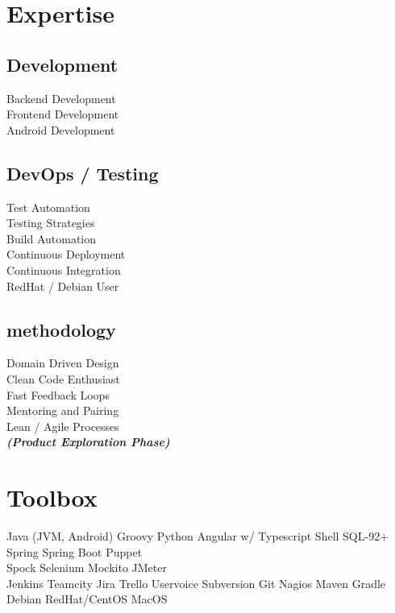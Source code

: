 \documentclass[]{resume}
\begin{document}
\begin{minipage}[t]{0.33\textwidth}

\section{Expertise}
\subsection{Development}
Backend Development \\
Frontend Development \\
Android Development \\
\sectionsep

\subsection{DevOps / Testing}
Test Automation \\
Testing Strategies \\
Build Automation \\
Continuous Deployment \\
Continuous Integration \\
RedHat / Debian User
\sectionsep

\subsection{methodology}
Domain Driven Design \\
Clean Code Enthusiast \\
Fast Feedback Loops \\
Mentoring and Pairing \\
Lean / Agile Processes \\
{\footnotesize \textit{\textbf{(Product Exploration Phase) }}} \\
\sectionsep


\section{Toolbox}
Java (JVM, Android) \textbullet{} Groovy \textbullet{} Python 
\textbullet{} Angular w/ Typescript \textbullet{} Shell \textbullet{} SQL-92+\\
Spring \textbullet{} Spring Boot \textbullet{} Puppet\\
Spock \textbullet{} Selenium \textbullet{} Mockito \textbullet{} JMeter\\
Jenkins \textbullet{} Teamcity \textbullet{} Jira \textbullet{} Trello 
\textbullet{} Uservoice \textbullet{} Subversion \textbullet{} Git  \textbullet{} Nagios \textbullet{} Maven \textbullet{} Gradle \\
Debian \textbullet{} RedHat/CentOS \textbullet{} MacOS
\sectionsep

%
%

\end{minipage} 
\end{document}
